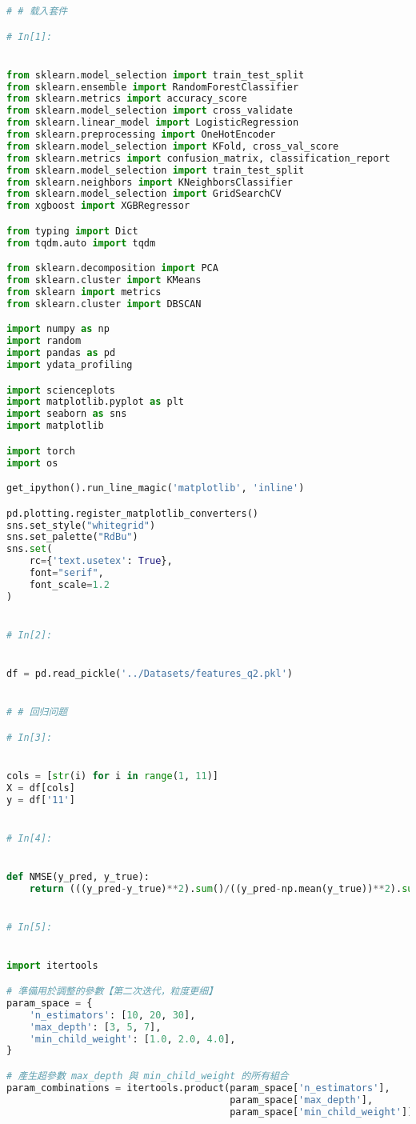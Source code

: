 \documentclass[withoutpreface,bwprint]{cumcmthesis}
\begin{document}
\begin{appendices}
\begin{lstlisting}[language=Python]
# # 载入套件

# In[1]:


from sklearn.model_selection import train_test_split
from sklearn.ensemble import RandomForestClassifier
from sklearn.metrics import accuracy_score
from sklearn.model_selection import cross_validate
from sklearn.linear_model import LogisticRegression
from sklearn.preprocessing import OneHotEncoder
from sklearn.model_selection import KFold, cross_val_score
from sklearn.metrics import confusion_matrix, classification_report
from sklearn.model_selection import train_test_split
from sklearn.neighbors import KNeighborsClassifier
from sklearn.model_selection import GridSearchCV
from xgboost import XGBRegressor

from typing import Dict
from tqdm.auto import tqdm

from sklearn.decomposition import PCA
from sklearn.cluster import KMeans
from sklearn import metrics
from sklearn.cluster import DBSCAN

import numpy as np
import random
import pandas as pd
import ydata_profiling

import scienceplots
import matplotlib.pyplot as plt
import seaborn as sns
import matplotlib

import torch
import os

get_ipython().run_line_magic('matplotlib', 'inline')

pd.plotting.register_matplotlib_converters()
sns.set_style("whitegrid")
sns.set_palette("RdBu")
sns.set(
    rc={'text.usetex': True},
    font="serif",
    font_scale=1.2
)


# In[2]:


df = pd.read_pickle('../Datasets/features_q2.pkl')


# # 回归问题

# In[3]:


cols = [str(i) for i in range(1, 11)]
X = df[cols]
y = df['11']


# In[4]:


def NMSE(y_pred, y_true):
    return (((y_pred-y_true)**2).sum()/((y_pred-np.mean(y_true))**2).sum())**(1/2)


# In[5]:


import itertools

# 準備用於調整的參數【第二次迭代，粒度更细】
param_space = {
    'n_estimators': [10, 20, 30],
    'max_depth': [3, 5, 7],
    'min_child_weight': [1.0, 2.0, 4.0],
}

# 產生超參數 max_depth 與 min_child_weight 的所有組合
param_combinations = itertools.product(param_space['n_estimators'],
                                       param_space['max_depth'],
                                       param_space['min_child_weight'])


\end{lstlisting}
\end{appendices}
\end{document}
